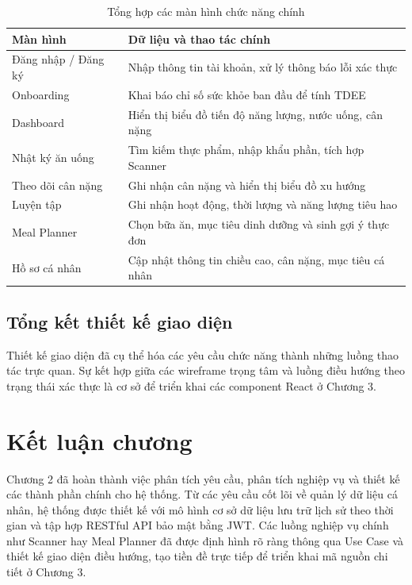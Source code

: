 \documentclass[12pt, a4paper]{report}
\begin{document}
\begin{table}[htbp]
\centering
\caption{Tổng hợp các màn hình chức năng chính}
\label{tab:man_hinh_chuc_nang}
\renewcommand{\arraystretch}{1.3}
\begin{tabular}{|>{\raggedright\arraybackslash}p{4cm}|>{\raggedright\arraybackslash}p{10cm}|}
\hline
\textbf{Màn hình} & \textbf{Dữ liệu và thao tác chính} \\
\hline
Đăng nhập / Đăng ký & Nhập thông tin tài khoản, xử lý thông báo lỗi xác thực \\
\hline
Onboarding & Khai báo chỉ số sức khỏe ban đầu để tính TDEE \\
\hline
Dashboard & Hiển thị biểu đồ tiến độ năng lượng, nước uống, cân nặng \\
\hline
Nhật ký ăn uống & Tìm kiếm thực phẩm, nhập khẩu phần, tích hợp Scanner \\
\hline
Theo dõi cân nặng & Ghi nhận cân nặng và hiển thị biểu đồ xu hướng \\
\hline
Luyện tập & Ghi nhận hoạt động, thời lượng và năng lượng tiêu hao \\
\hline
Meal Planner & Chọn bữa ăn, mục tiêu dinh dưỡng và sinh gợi ý thực đơn \\
\hline
Hồ sơ cá nhân & Cập nhật thông tin chiều cao, cân nặng, mục tiêu cá nhân \\
\hline
\end{tabular}
\end{table}

\subsection{Tổng kết thiết kế giao diện}
Thiết kế giao diện đã cụ thể hóa các yêu cầu chức năng thành những luồng thao tác trực quan. Sự kết hợp giữa các wireframe trọng tâm và luồng điều hướng theo trạng thái xác thực là cơ sở để triển khai các component React ở Chương 3.

\section{Kết luận chương}
Chương 2 đã hoàn thành việc phân tích yêu cầu, phân tích nghiệp vụ và thiết kế các thành phần chính cho hệ thống. Từ các yêu cầu cốt lõi về quản lý dữ liệu cá nhân, hệ thống được thiết kế với mô hình cơ sở dữ liệu lưu trữ lịch sử theo thời gian và tập hợp RESTful API bảo mật bằng JWT. Các luồng nghiệp vụ chính như Scanner hay Meal Planner đã được định hình rõ ràng thông qua Use Case và thiết kế giao diện điều hướng, tạo tiền đề trực tiếp để triển khai mã nguồn chi tiết ở Chương 3.
\end{document}
